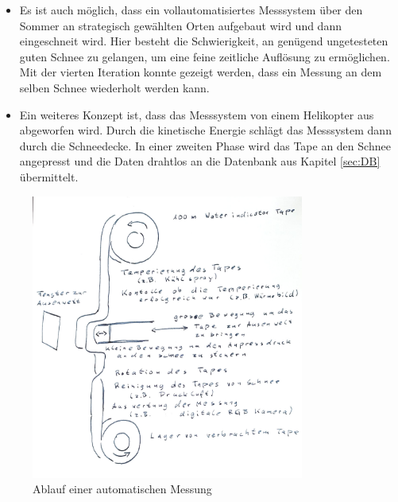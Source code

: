 \begin{itemize}
\item Es ist auch möglich, dass ein vollautomatisiertes Messsystem über den Sommer an strategisch gewählten Orten aufgebaut wird und dann eingeschneit wird. Hier besteht die Schwierigkeit, an genügend ungetesteten guten Schnee zu gelangen, um eine feine zeitliche Auflösung zu ermöglichen. Mit der vierten Iteration konnte gezeigt werden, dass ein Messung an dem selben Schnee wiederholt werden kann.


\item Ein weiteres Konzept ist, dass das Messsystem von einem Helikopter aus abgeworfen wird. Durch die kinetische Energie schlägt das Messsystem dann durch die Schneedecke. In einer zweiten Phase wird das Tape an den Schnee angepresst und die Daten drahtlos an die Datenbank aus Kapitel \ref{sec:DB} übermittelt.

\end{itemize}

\begin{figure}
    \centering
    \includegraphics[width=0.8\textwidth]{Bilder/KonzeptAut.jpeg}
    \caption{Ablauf einer automatischen Messung}
    \label{fig:AutMess}
\end{figure}
